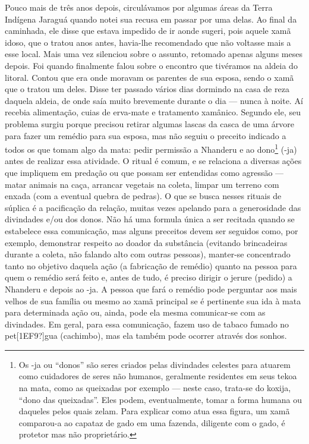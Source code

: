 \documentclass{article}
\begin{document}
Pouco mais de tr\^es anos depois, circul\'avamos por algumas \'areas da
Terra Ind\'igena Jaragu\'a quando notei sua recusa em passar por uma
delas. Ao final da caminhada, ele disse que estava impedido de ir aonde
sugeri, pois aquele xam\~a idoso, que o tratou anos antes, havia-lhe
recomendado que n\~ao voltasse mais a esse local. Mais uma vez
silenciou sobre o assunto, retomado apenas alguns meses depois. Foi
quando finalmente falou sobre o encontro que tiv\'eramos na aldeia do
litoral. Contou que era onde moravam os parentes de sua esposa, sendo o
xam\~a que o tratou um deles. Disse ter passado v\'arios dias dormindo
na casa de reza daquela aldeia, de onde sa\'ia muito brevemente durante
o dia --- nunca \`a noite. A\'i recebia alimenta\c{c}\~ao, cuias de
erva-mate e tratamento xam\^anico. Segundo ele, seu problema surgiu
porque precisou retirar algumas lascas da casca de uma \'arvore para
fazer um rem\'edio para sua esposa, mas n\~ao seguiu o preceito
indicado a todos os que tomam algo da mata: pedir permiss\~ao a
Nhanderu e ao dono\footnote{ Os {}-ja ou
{\textquotedblleft}donos{\textquotedblright} s\~ao seres criados pelas
divindades celestes para atuarem como cuidadores de seres n\~ao
humanos, geralmente residentes em seus tekoa na mata, como as queixadas
por exemplo --- neste caso, trata-se do koxija, {\textquotedblleft}dono
das queixadas{\textquotedblright}. Eles podem, eventualmente, tomar a
forma humana ou daqueles pelos quais zelam. Para explicar como atua
essa figura, um xam\~a comparou-a ao capataz de gado em uma fazenda,
diligente com o gado, \'e protetor mas n\~ao propriet\'ario.} ({}-ja)
antes de realizar essa atividade. O ritual \'e comum, e se relaciona a
diversas a\c{c}\~oes que impliquem em preda\c{c}\~ao ou que possam ser
entendidas como agress\~ao --- matar animais na ca\c{c}a, arrancar
vegetais na coleta, limpar um terreno com enxada (com a eventual quebra
de pedras). O que se busca nesses rituais de s\'uplica \'e a
pacifica\c{c}\~ao da rela\c{c}\~ao, muitas vezes apelando para a
generosidade das divindades e/ou dos donos. N\~ao h\'a uma formula
\'unica a ser recitada quando se estabelece essa comunica\c{c}\~ao, mas
alguns preceitos devem ser seguidos como, por exemplo, demonstrar
respeito ao doador da subst\^ancia (evitando brincadeiras durante a
coleta, n\~ao falando alto com outras pessoas), manter-se concentrado
tanto no objetivo daquela a\c{c}\~ao (a fabrica\c{c}\~ao de rem\'edio)
quanto na pessoa para quem o rem\'edio ser\'a feito e, antes de tudo,
\'e preciso dirigir o jerure (pedido) a Nhanderu e depois ao {}-ja. A
pessoa que far\'a o rem\'edio pode perguntar aos mais velhos de sua
fam\'ilia ou mesmo ao xam\~a principal se \'e pertinente sua ida \`a
mata para determinada a\c{c}\~ao ou, ainda, pode ela mesma comunicar-se
com as divindades. Em geral, para essa comunica\c{c}\~ao, fazem uso de
tabaco fumado no pet[1EF9?]gua (cachimbo), mas ela tamb\'em pode
ocorrer atrav\'es dos sonhos. 
\end{document}
